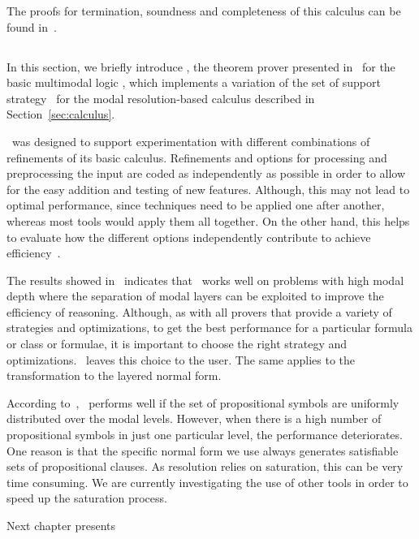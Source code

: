 The proofs for termination, soundness and completeness of this calculus can be
found in~\cite{nalon2015modal}.

\subsection{\ksp}
In this section, we briefly introduce \ksp, the theorem prover presented
in~\cite{Nalon2016} for the basic multimodal logic , which
implements a variation of the set of support strategy~\cite{wos1965efficiency}
for the modal resolution-based calculus described in Section~\ref{sec:calculus}.

\ksp\ was designed to support experimentation with different combinations of
refinements of its basic calculus. Refinements and options for processing and
preprocessing the input are coded as independently as possible in order to allow
for the easy addition and testing of new features. Although, this may not lead
to optimal performance, since techniques need to be applied one after another,
whereas most tools would apply them all together. On the other hand, this helps
to evaluate how the different options independently contribute to achieve
efficiency~\cite{Nalon2016}. 

The results showed in~\cite{Nalon2016} indicates that \ksp\ works well on
problems with high modal depth where the separation of modal layers can be
exploited to improve the efficiency of reasoning. Although, as with all provers
that provide a variety of strategies and optimizations, to get the best
performance for a particular formula or class or formulae, it is important to
choose the right strategy and optimizations. \ksp\ leaves this choice to the
user. The same applies to the transformation to the layered normal form.

According to~\cite{Nalon2016}, \ksp\ performs well if the set of propositional
symbols are uniformly distributed over the modal levels. However, when there is
a high number of propositional symbols in just one particular level, the
performance deteriorates. One reason is that the specific normal form we use
always generates satisfiable sets of propositional clauses. As resolution relies
on saturation, this can be very time consuming. We are currently investigating
the use of other tools in order to speed up the saturation process.

Next chapter presents 
